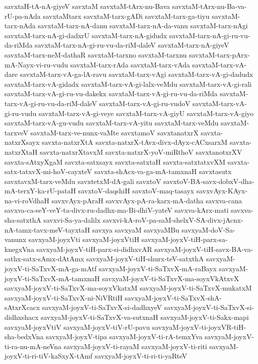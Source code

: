 {savxtaH-tA-nA-giyeV
savxtaM
savxtaM-tArx-nu-Bava
savxtaM-tArx-nu-Ba-va-rU-pa-nAda
savxtaMtarx
savxtaM-tarx-gADi
savxtaM-tarx-ga-tiyu
savxtaM-tarx-nAda
savxtaM-tarx-nA-danu
savxtaM-tarx-nA-da-vanu
savxtaM-tarx-nAgi
savxtaM-tarx-nA-gi-dadxrU
savxtaM-tarx-nA-gidudx
savxtaM-tarx-nA-gi-ru-vu-da-riMda
savxtaM-tarx-nA-gi-ru-vu-da-riM-daleV
savxtaM-tarx-nA-giyeV
savxtaM-tarx-neM-dathaR
savxtaM-tarxno
savxtaM-tarxnu
savxtaM-tarx-pArx-mA-Nayx-vi-ru-vudu
savxtaM-tarx-rAda
savxtaM-tarx-vAda
savxtaM-tarx-vA-dare
savxtaM-tarx-vA-ga-lA-ravu
savxtaM-tarx-vAgi
savxtaM-tarx-vA-gi-dadudx
savxtaM-tarx-vA-gidadx
savxtaM-tarx-vA-gi-lalx-veMdu
savxtaM-tarx-vA-gi-rali
savxtaM-tarx-vA-gi-ru-vu-dakekx
savxtaM-tarx-vA-gi-ru-vu-da-riMda
savxtaM-tarx-vA-gi-ru-vu-da-riM-daleV
savxtaM-tarx-vA-gi-ru-vudoV
savxtaM-tarx-vA-gi-ru-vudu
savxtaM-tarx-vA-gi-veye
savxtaM-tarx-vA-giyU
savxtaM-tarx-vA-giyo
savxtaM-tarx-vA-gu-vudu
savxtaM-tarx-vA-yitu
savxtaM-tarx-veMdu
savxtaM-tarxveV
savxtaM-tarx-ve-nunx-vaMte
savxtamoV
savxtanatxrX
savxta-natxrXsayx
savxta-natxrXtA
savxta-natxrX-tAvx-divx-dAyx-cACxsarxM
savxta-natxrXtaH
savxta-natxrXtavxM
savxta-natxrX-yoV-miRthoV
savxtanotxrXV
savxta-sAtxyXgaM
savxta-satxsayx
savxta-satxtaH
savxta-satxtatxvXM
savxta-satx-tatxvX-mi-hoV-cayxteV
savxta-shAcx-va-ga-mA-tamxnaH
savxtasutx
savxtavxM-tarx-veMdu
savxtetxM-dA-gali
savxtoV
savxtoV-BA-savx-dobxV-dha-mA-terxY-ka-rU-pataH
savxtoV-daqshiH
savxtoV-maq-tasayx
savxvAyx-KAyx-na-vi-roVdhaH
savxvAyx-pAraH
savxvAyx-pA-ra-karx-mA-datha
savxva-cana
savxva-ca-seY-veY-ta-divx-ru-dadhx-ma-Bi-dhiV-yateV
savxva-kArx-mati
savxva-sha-satxthA
savxvi-Sa-ya-dalilx
savxvi-kA-roV-pa-saM-shelxV-SA-divx-jAcnx-nA-tamx-tavx-meV-tayxtaH
savxya
savxyaM
savxyaMBu
savxyaM-doV-Sa-vanunx
savxyaM-joyxVti
savxyaM-joyxVtiH
savxyaM-joyxV-tiH-parx-sa-knegxVna
savxyaM-joyxV-tiH-parx-si-didhxvAR
savxyaM-joyxV-tiH-savx-BA-va-sathx-satx-sAmx-dAtAmx
savxyaM-joyxV-tiH-shurx-teV-satxthA
savxyaM-joyxV-ti-SaTxvX-mA-ga-mAtf
savxyaM-joyxV-ti-SaTxvX-mA-raBayx
savxyaM-joyxV-ti-SaTxvX-mA-tamxnaH
savxyaM-joyxV-ti-SaTxvX-ma-soyxVkAtxvX
savxyaM-joyxV-ti-SaTxvX-ma-soyxVkatxM
savxyaM-joyxV-ti-SaTxvX-mukatxM
savxyaM-joyxV-ti-SaTxvX-ni-NiVRtiH
savxyaM-joyxV-ti-SaTxvX-shA-sAtxrXcacx
savxyaM-joyxV-ti-SaTxvX-si-dadhxyeV
savxyaM-joyxV-ti-SaTxvX-si-didhxshacx
savxyaM-joyxV-ti-SaTxvX-va-sutxnaH
savxyaM-joyxV-ti-Sakx-mapi
savxyaM-joyxVtiV
savxyaM-joyxV-tiV-rU-pavu
savxyaM-joyxV-ti-joyxVR-tiH-sha-bedxVna
savxyaM-joyxV-tipa
savxyaM-joyxV-ti-rA-temxYva
savxyaM-joyxV-ti-ra-nu-mA-neVna
savxyaM-joyxV-ti-rayaM
savxyaM-joyxV-ti-riti
savxyaM-joyxV-ti-ri-tiV-kaSxyX-tAmf
savxyaM-joyxV-ti-ri-ti-yaRteV
}
